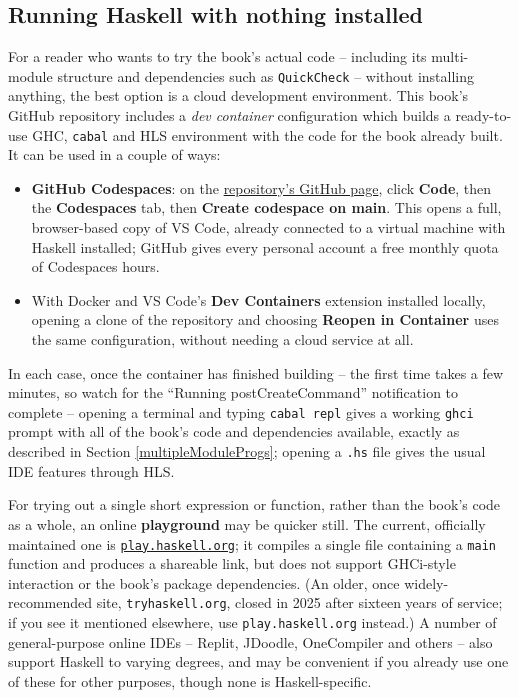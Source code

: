 \subsection*{Running Haskell with nothing installed}

For a reader who wants to try the book's actual code -- including its multi-module structure and dependencies such as \texttt{QuickCheck} -- without installing anything, the best option is a cloud development environment. This book's GitHub repository includes a \emph{dev container} configuration which builds a ready-to-use GHC, \texttt{cabal} and HLS environment with the code for the book already built. It can be used in a couple of ways:
\begin{itemize}
\item \textbf{GitHub Codespaces}: on the \href{https://github.com/simonjohnthompson/haskellcraft}{repository's GitHub page}, click \textbf{Code}, then the \textbf{Codespaces} tab, then \textbf{Create codespace on main}. This opens a full, browser-based copy of VS Code, already connected to a virtual machine with Haskell installed; GitHub gives every personal account a free monthly quota of Codespaces hours.
\item With Docker and VS Code's \textbf{Dev Containers} extension installed locally, opening a clone of the repository and choosing \textbf{Reopen in Container} uses the same configuration, without needing a cloud service at all.
\end{itemize}
In each case, once the container has finished building -- the first time takes a few minutes, so watch for the ``Running postCreateCommand'' notification to complete -- opening a terminal and typing \texttt{cabal repl} gives a working \texttt{ghci} prompt with all of the book's code and dependencies available, exactly as described in Section \ref{multipleModuleProgs}; opening a \texttt{.hs} file gives the usual IDE features through HLS.

For trying out a single short expression or function, rather than the book's code as a whole, an online \textbf{playground} may be quicker still. The current, officially maintained one is \href{https://play.haskell.org}{\texttt{play.haskell.org}}; it compiles a single file containing a \texttt{main} function and produces a shareable link, but does not support GHCi-style interaction or the book's package dependencies. (An older, once widely-recommended site, \texttt{tryhaskell.org}, closed in 2025 after sixteen years of service; if you see it mentioned elsewhere, use \texttt{play.haskell.org} instead.) A number of general-purpose online IDEs -- Replit, JDoodle, OneCompiler and others -- also support Haskell to varying degrees, and may be convenient if you already use one of these for other purposes, though none is Haskell-specific.

